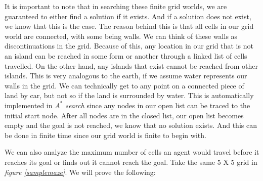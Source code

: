 It is important to note that in searching these finite grid worlds, we are guaranteed to either find a solution if it exists. And if a solution does not exist, we know that this is the case. The reason behind this is that all cells in our grid world are connected, with some being walls. We can think of these walls as discontinuations in the grid. Because of this, any location in our grid that is not an island can be reached in some form or another through a linked list of cells travelled. On the other hand, any islands that exist cannot be reached from other islands. This is very analogous to the earth, if we assume water represents our walls in the grid. We can technically get to any point on a connected piece of land by car, but not so if the land is surrounded by water. This is automatically implemented in \emph{$A^*$ search} since any nodes in our open list can be traced to the initial start node. After all nodes are in the closed list, our open list becomes empty  and the goal is not reached, we know that no solution exists. And this can be done in finite time since our grid world is finite to begin with.

We can also analyze the maximum number of cells an agent would travel before it reaches its goal or finds out it cannot reach the goal. Take the same 5 X 5 grid in \emph{figure \ref{samplemaze}}. We will prove the following:


